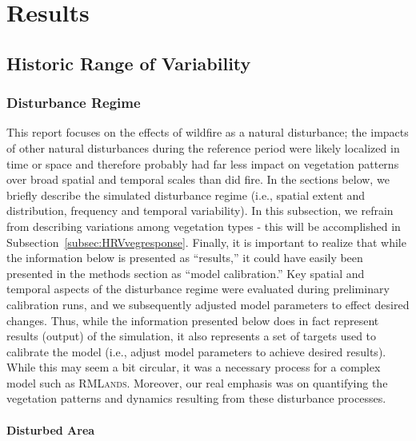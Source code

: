\chapter{Results}

\section{Historic Range of Variability}

\subsection{Disturbance Regime}

This report focuses on the effects of wildfire as a natural disturbance; the impacts of other natural disturbances during the reference period were likely localized in time or space and therefore probably had far less impact on vegetation patterns over broad spatial and temporal scales than did fire. In the sections below, we briefly describe the simulated disturbance regime (i.e., spatial extent and distribution, frequency and temporal variability). In this subsection, we refrain from describing variations among vegetation types - this will be accomplished in Subsection~\ref{subsec:HRVvegresponse}. Finally, it is important to realize that while the information below is presented as ``results,'' it could have easily been presented in the methods section as ``model calibration.'' Key spatial and temporal aspects of the disturbance regime were evaluated during preliminary calibration runs, and we subsequently adjusted model parameters to effect desired changes. Thus, while the information presented below does in fact represent results (output) of the simulation, it also represents a set of targets used to calibrate the model (i.e., adjust model parameters to achieve desired results). While this may seem a bit circular, it was a necessary process for a complex model such as \textsc{RMLands}. Moreover, our real emphasis was on quantifying the vegetation patterns and dynamics resulting from these disturbance processes.

\subsubsection{Disturbed Area}

